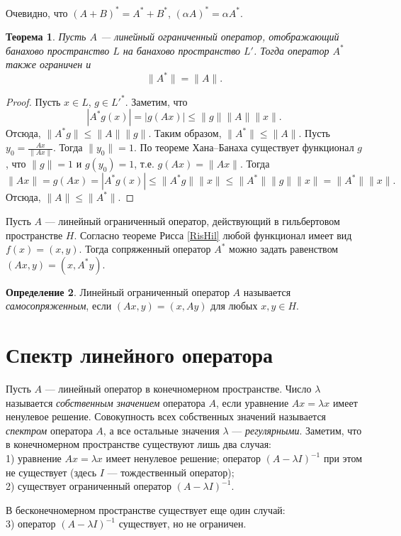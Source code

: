 \documentclass[12pt, titlepage, oneside]{amsbook}
\newtheorem{theorem}{Теорема}[chapter]
\theoremstyle{definition}
\newtheorem{definition}[theorem]{Определение}
\theoremstyle{remark}
\begin{document}
Очевидно, что $(A+B)^*=A^*+B^*$, $(\alpha A)^*=\alpha A^*$.

\begin{theorem}
	\label{Op6}
	Пусть $A$  --- линейный ограниченный оператор, отображающий банахово пространство $L$ на банахово пространство $L'$. Тогда оператор $A^*$ также ограничен и $$\|A^*\|=\|A\|.$$
\end{theorem}

\begin{proof}
	Пусть $x\in L$, $g\in L'^*$. Заметим, что $$|A^*g(x)|=|g(Ax)|\leq\|g\|\|A\|\|x\|.$$ Отсюда, $\|A^*g\|\leq\|A\|\|g\|$. Таким образом, $\|A^*\|\leq\|A\|.$ Пусть $y_0=\frac{Ax}{\|Ax\|}$. Тогда $\|y_0\|=1$. По теореме Хана--Банаха существует функционал $g$, что $\|g\|=1$ и $g(y_0)=1$, т.е. $g(Ax)=\|Ax\|$. Тогда $$\|Ax\|=g(Ax)=|A^*g(x)|\leq\|A^*g\|\|x\|\leq \|A^*\| \|g\|\|x\|=\|A^*\|\|x\|.$$ Отсюда, $\|A\|\leq\|A^*\|$.
\end{proof}

Пусть $A$ --- линейный ограниченный оператор, действующий в гильбертовом пространстве $H$. Согласно теореме Рисса \ref{RisHil} любой функционал имеет вид $f(x)=(x,y)$. Тогда сопряженный оператор $A^*$ можно задать равенством $(Ax,y)=(x,A^*y)$.

\begin{definition}
	Линейный ограниченный оператор $A$ называется \emph{самосопряженным}, если $(Ax,y)=(x,Ay)$ для любых $x,y\in H$.
\end{definition}

\section{Спектр линейного оператора}

Пусть $A$ --- линейный оператор в конечномерном пространстве. Число $\lambda$ называется \emph{собственным значением} оператора $A$, если уравнение $Ax=\lambda x$ имеет ненулевое решение. Совокупность всех собственных значений называется \emph{спектром} оператора $A$, а все остальные значения $\lambda$ --- \emph{регулярными}. Заметим, что в конечномерном пространстве существуют лишь два случая:\\
1) уравнение $Ax=\lambda x$ имеет ненулевое решение; оператор $(A-\lambda I)^{-1}$ при этом не существует (здесь $I$ --- тождественный оператор);\\
2) существует ограниченный оператор $(A-\lambda I)^{-1}$.

В бесконечномерном пространстве существует еще один случай:\\
3) оператор $(A-\lambda I)^{-1}$ существует, но не ограничен.
\end{document}
